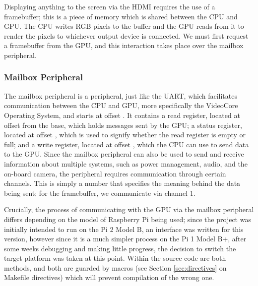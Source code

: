     Displaying anything to the screen via the HDMI requires the use of a
    framebuffer; this is a piece of memory which is shared between the CPU and
    GPU. The CPU writes RGB pixels to the buffer and the GPU reads from it to
    render the pixels to whichever output device is connected. We must first
    request a framebuffer from the GPU, and this interaction takes place over
    the mailbox peripheral.

    \subsubsection{Mailbox Peripheral}
        The mailbox peripheral is a peripheral, just like the UART, which
        facilitates communication between the CPU and GPU, more specifically the
        VideoCore Operating System, and starts at offset 
        \cite{Mailboxes}. It contains a read register, located at offset
         from the base, which holds messages sent by the GPU; a status
        register, located at offset , which is used to signify
        whether the read register is empty or full; and a write register,
        located at offset , which the CPU can use to send data to the
        GPU. Since the mailbox peripheral can also be used to send and receive
        information about multiple systems, such as power management, audio, and
        the on-board camera, the peripheral requires communication through
        certain channels. This is simply a number that specifies the meaning
        behind the data being sent; for the framebuffer, we communicate via
        channel 1.

        Crucially, the process of communicating with the GPU via the mailbox
        peripheral differs depending on the model of Raspberry Pi being used;
        since the project was initially intended to run on the Pi 2 Model B, an
        interface was written for this version, however since it is a much
        simpler process on the Pi 1 Model B+, after some weeks debugging and
        making little progress, the decision to switch the target platform was
        taken at this point. Within the source code are both methods, and both
        are guarded by macros (see Section \ref{sec:directives} on Makefile
        directives) which will prevent compilation of the wrong one.

